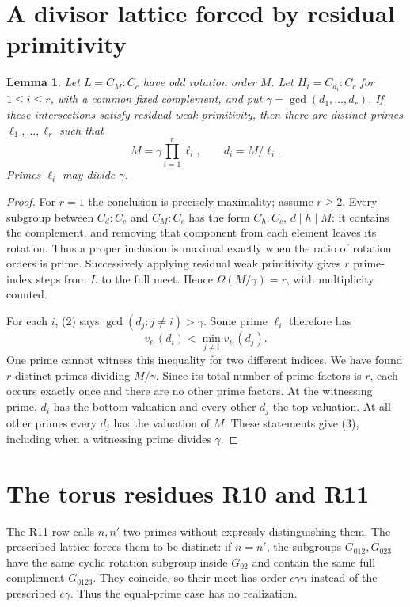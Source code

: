 \documentclass[11pt,a4paper]{article}
\newtheorem{lemma}{Lemma}\newtheorem{theorem}[lemma]{Theorem}
\begin{document}
\section{A divisor lattice forced by residual primitivity}
\begin{lemma}\label{divisors}
Let $L=C_M:C_c$ have odd rotation order $M$. Let
$H_i=C_{d_i}:C_c$ for $1\le i\le r$, with a common fixed complement,
and put $\gamma=\gcd(d_1,\ldots,d_r)$. If these intersections satisfy
residual weak primitivity, then there are distinct primes
$\ell_1,\ldots,\ell_r$ such that
\[
 M=\gamma\prod_{i=1}^r\ell_i,
 \qquad d_i=M/\ell_i.                         \tag{3}
\]
Primes $\ell_i$ may divide $\gamma$.
\end{lemma}
\begin{proof}
For $r=1$ the conclusion is precisely maximality; assume $r\ge2$.
Every subgroup between $C_d:C_c$ and $C_M:C_c$ has the form
$C_h:C_c$, $d\mid h\mid M$: it contains the complement, and
removing that component from each element leaves its rotation.
Thus a proper inclusion is maximal exactly when the ratio of
rotation orders is prime. Successively applying residual weak
primitivity gives $r$ prime-index steps from $L$ to the full meet.
Hence $\Omega(M/\gamma)=r$, with multiplicity counted.

For each $i$, (2) says
$\gcd(d_j:j\ne i)>\gamma$. Some prime $\ell_i$ therefore has
\[
 v_{\ell_i}(d_i)<\min_{j\ne i}v_{\ell_i}(d_j).
\]
One prime cannot witness this inequality for two different indices.
We have found $r$ distinct primes dividing $M/\gamma$. Since its
total number of prime factors is $r$, each occurs exactly once and
there are no other prime factors. At the witnessing prime, $d_i$
has the bottom valuation and every other $d_j$ the top valuation.
At all other primes every $d_j$ has the valuation of $M$. These
statements give (3), including when a witnessing prime divides
$\gamma$.
\end{proof}

\section{The torus residues R10 and R11}
The R11 row calls $n,n'$ two primes without expressly distinguishing
them. The prescribed lattice forces them to be distinct: if $n=n'$,
the subgroups $G_{012},G_{023}$ have the same cyclic rotation subgroup
inside $G_{02}$ and contain the same full complement $G_{0123}$.
They coincide, so their meet has order $c\gamma n$ instead of the
prescribed $c\gamma$. Thus the equal-prime case has no realization.
\end{document}
